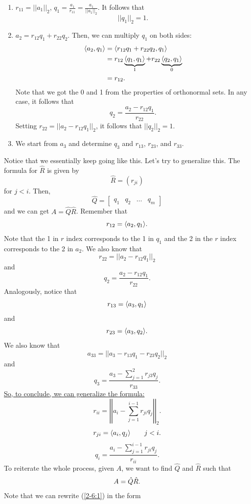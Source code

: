 \documentclass[letterpaper]{article}
\newcommand{\0}{\mathbf{0}}
\begin{document}
\begin{enumerate}
    \item $r_{11} = ||a_1||_2$, $q_1 = \frac{a_1}{r_{11}} = \frac{a_1}{||a_1||_2}$. It follows that \[||q_1||_2 = 1.\]
    \item $a_2 = r_{12}q_1 + r_{22}q_2$. Then, we can multiply $q_1$ on both sides: 
    \begin{equation*}
        \begin{aligned}
            \langle a_2, q_1 \rangle &= \langle r_{12}q_1 + r_{22}q_2, q_1 \rangle \\ 
                &= r_{12}\underbrace{\langle q_1, q_1 \rangle}_{1} + r_{22} \underbrace{\langle q_2, q_1 \rangle}_{0} \\ 
                &= r_{12}.
        \end{aligned}
    \end{equation*}
    Note that we got the 0 and 1 from the properties of orthonormal sets. In any case, it follows that \[q_2 = \frac{a_2 - r_{12}q_1}{r_{22}}.\]
    Setting $r_{22} = ||a_2 - r_{12}q_1||_2$, it follows that $||q_2||_2 = 1$. 

    \item We start from $a_3$ and determine $q_3$ and $r_{13}$, $r_{23}$, and $r_{33}$. 
\end{enumerate}
Notice that we essentially keep going like this. Let's try to generalize this. The formula for $\hat{R}$ is given by 
\[\hat{R} = (r_{ji})\]
for $j < i$. Then, \[\hat{Q} = \begin{bmatrix}
    q_1 & q_2 & \hdots & q_m
\end{bmatrix}\] and we can get $A = \hat{Q} \hat{R}$. Remember that 
\[r_{12} = \langle a_2, q_1 \rangle.\] Note that the 1 in $r$ index corresponds to the 1 in $q_1$ and the 2 in the $r$ index corresponds to the 2 in $a_2$. We also know that 
\[r_{22} = ||a_2 - r_{12}q_1||_2\] and 
\[q_2 = \frac{a_2 - r_{12}q_1}{r_{22}}.\]
Analogously, notice that 
\[r_{13} = \langle a_3, q_1 \rangle\] and \[r_{23} = \langle a_3, q_2 \rangle.\] We also know that \[a_{33} = ||a_3 - r_{13}q_1 - r_{23}q_2||_2\] and \[q_3 = \frac{a_3 - \sum_{j = 1}^{2} r_{j3} q_j}{r_{33}}.\] 
\underline{So, to conclude, we can generalize the formula:}
\[r_{ii} = \left|\left| a_{i} - \sum_{j = 1}^{i - 1} r_{ji} q_j \right|\right|_2.\]
\[r_{ji} = \langle a_i, q_j \rangle \qquad j < i.\]
\[q_i = \frac{a_i - \sum_{j = 1}^{i - 1} r_{ji} q_j}{r_{ii}}.\]
To reiterate the whole process, given $A$, we want to find $\hat{Q}$ and $\hat{R}$ such that 
\begin{equation}{\label{2-6:1}}
    A = \hat{Q}\hat{R}.
\end{equation} Note that we can rewrite ({\ref{2-6:1}}) in the form 
\end{document}
